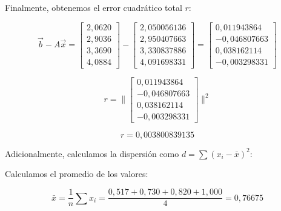 Finalmente, obtenemos el error cuadrático total $r$:

\begin{equation}
    \vec{b} - A\vec{x} =
    \begin{bmatrix}
        2{,}0620 \\
        2{,}9036 \\
        3{,}3690 \\
        4{,}0884
    \end{bmatrix}
    -
    \begin{bmatrix}
        2{,}050056136 \\
        2{,}950407663 \\
        3{,}330837886 \\
        4{,}091698331
    \end{bmatrix}
    =
    \begin{bmatrix}
        0{,}011943864 \\
        -0{,}046807663 \\
        0{,}038162114 \\
        -0{,}003298331
    \end{bmatrix}
    \label{eq:error-cuadrados-minimos-resolucion}
\end{equation}

\begin{equation}
    r = \|
    \begin{bmatrix}
        0{,}011943864 \\
        -0{,}046807663 \\
        0{,}038162114 \\
        -0{,}003298331
    \end{bmatrix}
    \| ^2
    \label{eq:error-cuadrados-minimos-resolucion-2}
\end{equation}

\begin{equation}
    r = 0{,}003800839135
    \label{eq:error-cuadrados-minimos-r}
\end{equation}

Adicionalmente, calculamos la dispersión como $d = \sum (x_i - \bar{x})^2$:

Calculamos el promedio de los valores:

\begin{equation}
    \bar{x} = \frac{1}{n} \sum x_i = \frac{0{,}517 + 0{,}730 + 0{,}820 + 1{,}000}{4} = 0{,}76675
    \label{eq:dispersion-cuadrados-minimos-r-promedio}
\end{equation}

